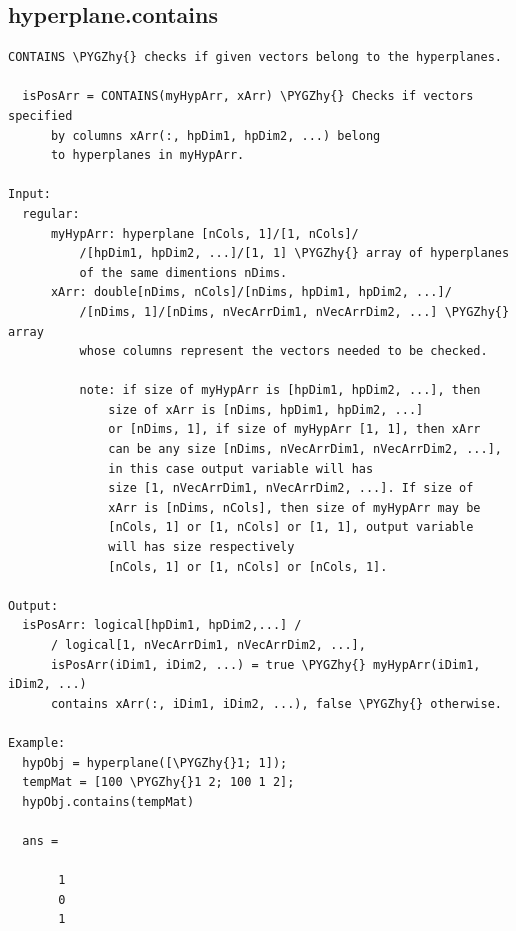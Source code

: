 \documentclass[letterpaper,10pt,english]{sphinxmanual}
\def\PYGZhy{\char`\-}
\begin{document}
\subsection{hyperplane.contains}
\label{chap_functions:hyperplane-contains}
\begin{Verbatim}[commandchars=\\\{\}]
CONTAINS \PYGZhy{} checks if given vectors belong to the hyperplanes.

  isPosArr = CONTAINS(myHypArr, xArr) \PYGZhy{} Checks if vectors specified
      by columns xArr(:, hpDim1, hpDim2, ...) belong
      to hyperplanes in myHypArr.

Input:
  regular:
      myHypArr: hyperplane [nCols, 1]/[1, nCols]/
          /[hpDim1, hpDim2, ...]/[1, 1] \PYGZhy{} array of hyperplanes
          of the same dimentions nDims.
      xArr: double[nDims, nCols]/[nDims, hpDim1, hpDim2, ...]/
          /[nDims, 1]/[nDims, nVecArrDim1, nVecArrDim2, ...] \PYGZhy{} array
          whose columns represent the vectors needed to be checked.

          note: if size of myHypArr is [hpDim1, hpDim2, ...], then
              size of xArr is [nDims, hpDim1, hpDim2, ...]
              or [nDims, 1], if size of myHypArr [1, 1], then xArr
              can be any size [nDims, nVecArrDim1, nVecArrDim2, ...],
              in this case output variable will has
              size [1, nVecArrDim1, nVecArrDim2, ...]. If size of
              xArr is [nDims, nCols], then size of myHypArr may be
              [nCols, 1] or [1, nCols] or [1, 1], output variable
              will has size respectively
              [nCols, 1] or [1, nCols] or [nCols, 1].

Output:
  isPosArr: logical[hpDim1, hpDim2,...] /
      / logical[1, nVecArrDim1, nVecArrDim2, ...],
      isPosArr(iDim1, iDim2, ...) = true \PYGZhy{} myHypArr(iDim1, iDim2, ...)
      contains xArr(:, iDim1, iDim2, ...), false \PYGZhy{} otherwise.

Example:
  hypObj = hyperplane([\PYGZhy{}1; 1]);
  tempMat = [100 \PYGZhy{}1 2; 100 1 2];
  hypObj.contains(tempMat)

  ans =

       1
       0
       1
\end{Verbatim}
\end{document}
